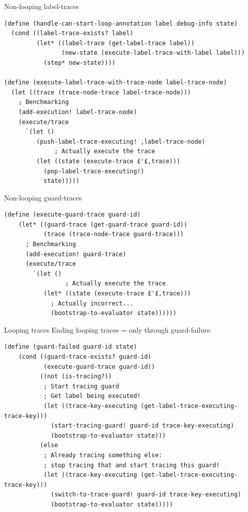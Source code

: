 \documentclass{beamer}
\begin{document}
\begin{frame}[fragile]{Non-looping label-traces}
\begin{lstlisting}[basicstyle = \scriptsize\ttfamily, escapechar = £]
(define (handle-can-start-loop-annotation label debug-info state)
  (cond ((label-trace-exists? label)
         (let* ((label-trace (get-label-trace label))
                (new-state (execute-label-trace-with-label label)))
           (step* new-state))))
  
(define (execute-label-trace-with-trace-node label-trace-node)
  (let ((trace (trace-node-trace label-trace-node)))
    ; Benchmarking
    (add-execution! label-trace-node)
    (execute/trace
      `(let ()
         (push-label-trace-executing! ,label-trace-node)
              ; Actually execute the trace
         (let ((state (execute-trace £'£,trace)))
           (pop-label-trace-executing!)
           state)))))
\end{lstlisting}
\end{frame}

\begin{frame}[fragile]{Non-looping guard-traces}
\begin{lstlisting}[basicstyle = \scriptsize\ttfamily, escapechar = £]
(define (execute-guard-trace guard-id)
    (let* ((guard-trace (get-guard-trace guard-id))
           (trace (trace-node-trace guard-trace)))
      ; Benchmarking
      (add-execution! guard-trace)
      (execute/trace
        `(let ()
                 ; Actually execute the trace
           (let* ((state (execute-trace £'£,trace)))
             ; Actually incorrect...
             (bootstrap-to-evaluator state))))))
\end{lstlisting}
\end{frame}

\begin{frame}[fragile]{Looping traces}
Ending looping traces = only through guard-failure
\begin{lstlisting}[basicstyle = \tiny\ttfamily, escapechar = £]
 (define (guard-failed guard-id state)
    (cond ((guard-trace-exists? guard-id)
           (execute-guard-trace guard-id))
          ((not (is-tracing?))
           ; Start tracing guard
           ; Get label being executed!
           (let ((trace-key-executing (get-label-trace-executing-trace-key)))
             (start-tracing-guard! guard-id trace-key-executing)
             (bootstrap-to-evaluator state)))
          (else
           ; Already tracing something else:
           ; stop tracing that and start tracing this guard!
           (let ((trace-key-executing (get-label-trace-executing-trace-key)))
             (switch-to-trace-guard! guard-id trace-key-executing)
             (bootstrap-to-evaluator state)))))
\end{lstlisting}
\end{frame}
\end{document}
